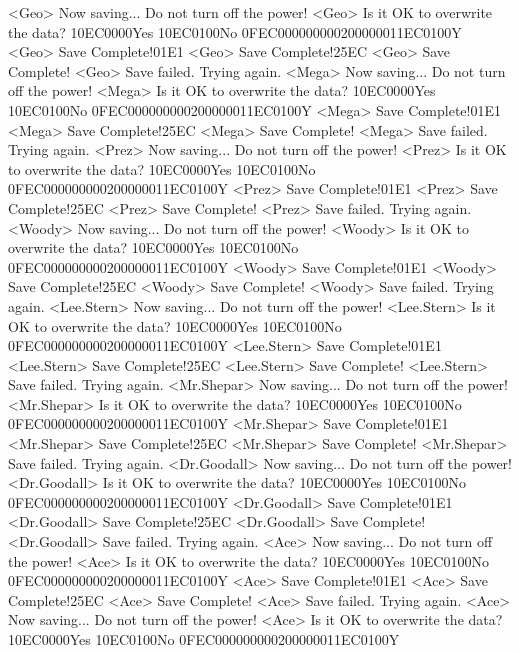 <Geo> Now saving... Do not turn off the power!
<Geo> Is it OK to overwrite the data? {10}{EC}{00}{00}Yes {10}{EC}{01}{00}No {0F}{EC}{00}{00}{00}{00}{02}{00}{00}{00}{11}{EC}{01}{00}Y
<Geo> Save Complete!{01}{E1}
<Geo> Save Complete!{25}{EC}
<Geo> Save Complete! 
<Geo> Save failed. Trying again. 
<Mega> Now saving... Do not turn off the power!
<Mega> Is it OK to overwrite the data? {10}{EC}{00}{00}Yes {10}{EC}{01}{00}No {0F}{EC}{00}{00}{00}{00}{02}{00}{00}{00}{11}{EC}{01}{00}Y
<Mega> Save Complete!{01}{E1}
<Mega> Save Complete!{25}{EC}
<Mega> Save Complete! 
<Mega> Save failed. Trying again. 
<Prez> Now saving... Do not turn off the power!
<Prez> Is it OK to overwrite the data? {10}{EC}{00}{00}Yes {10}{EC}{01}{00}No {0F}{EC}{00}{00}{00}{00}{02}{00}{00}{00}{11}{EC}{01}{00}Y
<Prez> Save Complete!{01}{E1}
<Prez> Save Complete!{25}{EC}
<Prez> Save Complete! 
<Prez> Save failed. Trying again. 
<Woody> Now saving... Do not turn off the power!
<Woody> Is it OK to overwrite the data? {10}{EC}{00}{00}Yes {10}{EC}{01}{00}No {0F}{EC}{00}{00}{00}{00}{02}{00}{00}{00}{11}{EC}{01}{00}Y
<Woody> Save Complete!{01}{E1}
<Woody> Save Complete!{25}{EC}
<Woody> Save Complete! 
<Woody> Save failed. Trying again. 
<Lee.Stern> Now saving... Do not turn off the power!
<Lee.Stern> Is it OK to overwrite the data? {10}{EC}{00}{00}Yes {10}{EC}{01}{00}No {0F}{EC}{00}{00}{00}{00}{02}{00}{00}{00}{11}{EC}{01}{00}Y
<Lee.Stern> Save Complete!{01}{E1}
<Lee.Stern> Save Complete!{25}{EC}
<Lee.Stern> Save Complete! 
<Lee.Stern> Save failed. Trying again. 
<Mr.Shepar> Now saving... Do not turn off the power!
<Mr.Shepar> Is it OK to overwrite the data? {10}{EC}{00}{00}Yes {10}{EC}{01}{00}No {0F}{EC}{00}{00}{00}{00}{02}{00}{00}{00}{11}{EC}{01}{00}Y
<Mr.Shepar> Save Complete!{01}{E1}
<Mr.Shepar> Save Complete!{25}{EC}
<Mr.Shepar> Save Complete! 
<Mr.Shepar> Save failed. Trying again. 
<Dr.Goodall> Now saving... Do not turn off the power!
<Dr.Goodall> Is it OK to overwrite the data? {10}{EC}{00}{00}Yes {10}{EC}{01}{00}No {0F}{EC}{00}{00}{00}{00}{02}{00}{00}{00}{11}{EC}{01}{00}Y
<Dr.Goodall> Save Complete!{01}{E1}
<Dr.Goodall> Save Complete!{25}{EC}
<Dr.Goodall> Save Complete! 
<Dr.Goodall> Save failed. Trying again. 
<Ace> Now saving... Do not turn off the power!
<Ace> Is it OK to overwrite the data? {10}{EC}{00}{00}Yes {10}{EC}{01}{00}No {0F}{EC}{00}{00}{00}{00}{02}{00}{00}{00}{11}{EC}{01}{00}Y
<Ace> Save Complete!{01}{E1}
<Ace> Save Complete!{25}{EC}
<Ace> Save Complete! 
<Ace> Save failed. Trying again. 
<Ace> Now saving... Do not turn off the power!
<Ace> Is it OK to overwrite the data? {10}{EC}{00}{00}Yes {10}{EC}{01}{00}No {0F}{EC}{00}{00}{00}{00}{02}{00}{00}{00}{11}{EC}{01}{00}Y
